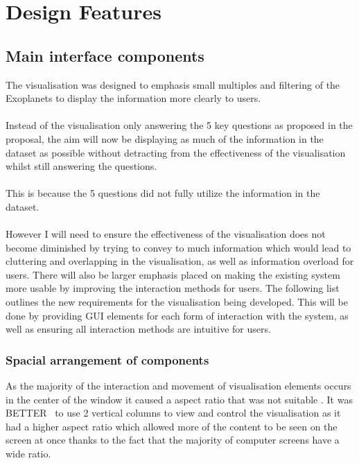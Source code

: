 \section{Design Features}
\subsection{Main interface components}
The visualisation was designed to emphasis small multiples and filtering of the Exoplanets to display the information more clearly to users. 
\\\\
Instead of the visualisation only answering the 5 key questions as proposed in the proposal, the aim will now be displaying as much of the information in the dataset as possible without detracting from the effectiveness of the visualisation whilst still answering the questions. 
\\\\
This is because the 5 questions did not fully utilize the information in the dataset. 
\\\\
However I will need to ensure the effectiveness of the visualisation does not become diminished by trying to convey to much information which would lead to cluttering and overlapping in the visualisation, as well as information overload for users. There will also be larger emphasis placed on making the existing system more usable by improving the interaction methods for users. The following list outlines the new requirements for the visualisation being developed. This will be done by providing GUI elements for each form of interaction with the system, as well as ensuring all interaction methods are intuitive for users. 
\subsubsection{Spacial arrangement of components}
As the majority of the interaction and movement of visualisation elements occurs in the center of the window it caused a aspect ratio that was not suitable . It was BETTER~ to use 2 vertical columns to view and control the visualisation as it had a higher aspect ratio which allowed more of the content to be seen on the screen at once thanks to the fact that the majority of computer screens have a wide ratio.

